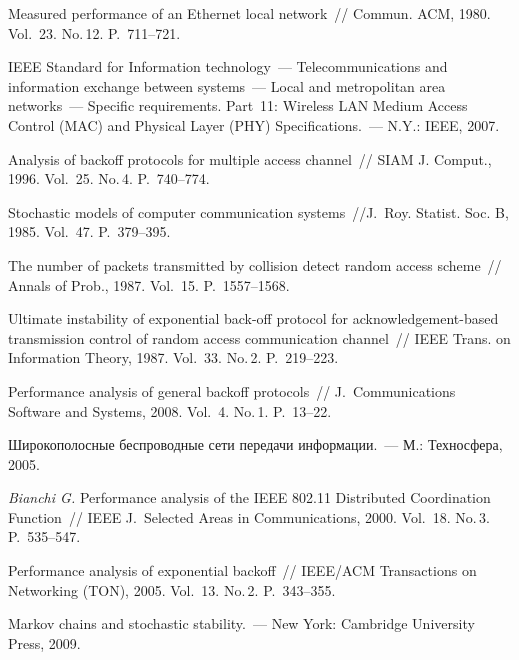 \begin{multicols}{2}
{{\begin{thebibliography}{99}
  Measured performance of an Ethernet local network~//
  Commun. ACM, 1980. Vol.~23. No.\,12. P.~711--721.

  IEEE Standard for Information technology~--- Telecommunications and information exchange between systems~---
  Local and metropolitan area networks~--- Specific requirements.
  Part~11: Wireless LAN Medium Access Control (MAC)
  and Physical Layer (PHY) Specifications.~--- N.Y.: IEEE, 2007.

  Analysis of backoff protocols for multiple access channel~// SIAM J. Comput., 1996. Vol.~25. No.\,4. P.~740--774.

  Stochastic models of computer   communication systems~//J.~Roy. Statist. Soc. B, 1985. Vol.~47. P.~379--395.

  The number of packets   transmitted by collision detect random access scheme~//
  Annals of Prob., 1987. Vol.~15. P.~1557--1568.

  Ultimate instability of exponential back-off
  protocol for acknowledgement-based transmission control of random
  access communication channel~// IEEE Trans. on Information Theory, 1987. Vol.~33. No.\,2. P.~219--223.


  Performance analysis of general backoff  protocols~// J.~Communications Software and Systems, 2008. Vol.~4. No.\,1. P.~13--22.


  Широкополосные беспроводные сети передачи информации.~--- М.: Техносфера, 2005.

  {\it Bianchi G.} 
  Performance analysis of the IEEE 802.11 Distributed Coordination Function~//
  IEEE J.~Selected Areas in Communications, 2000. Vol.~18. No.\,3. P.~535--547.
  
  Performance analysis   of exponential backoff~// IEEE/ACM Transactions on Networking (TON), 2005. 
  Vol.~13. No.\,2. P.~343--355.

  Markov chains and stochastic stability.~--- New York: Cambridge University Press, 2009.


\end{thebibliography}}}
\end{multicols}
